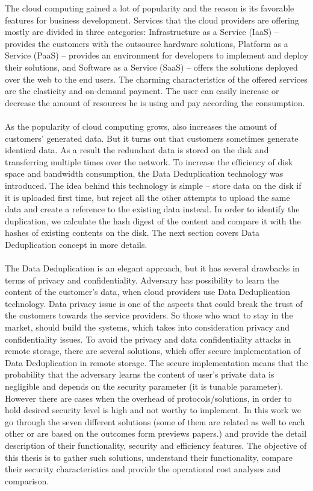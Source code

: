 \documentclass[12pt]{article}
\begin{document}
The cloud computing gained a lot of popularity and the reason is its  favorable features for  business development. Services that the cloud providers are offering  mostly are  divided in three categories: Infrastructure as a Service (IaaS) -- provides the customers with the outsource hardware solutions, Platform as a Service (PaaS) -- provides an environment for developers to implement and deploy their solutions, and Software as a Service (SaaS) -- offers the solutions deployed over the web to the end users. The  charming characteristics of the offered services  are the elasticity and on-demand payment. The user can easily increase or decrease the amount of resources he is using and pay according the consumption.\\\\
As the popularity of cloud computing grows, also increases the amount of customers' generated data. But it turns out that customers sometimes generate identical data.\cite{ratio} As a result the redundant data is stored on the disk and transferring multiple times over the network. To increase the efficiency of disk space and bandwidth consumption, the Data Deduplication
technology was introduced. The idea behind this technology is simple -- store data on the disk if it is uploaded first time, but reject  all the other attempts to upload the same data and create a reference to the existing data instead. In order to identify the duplication, we calculate the hash digest of the content  and compare it with the hashes of existing contents on the disk. The next section covers Data Deduplication concept in more details.\\\\
The Data Deduplication is an elegant approach, but it has several drawbacks in terms of privacy and confidentiality. Adversary has possibility to learn the content of the customer's data, when cloud providers use Data Deduplication technology. Data privacy issue  is one of the aspects that could break the trust of the customers towards the service providers. So those who want to stay in the market, should build the systems, which takes into consideration privacy and confidentiality issues. To avoid the privacy and data confidentiality attacks in remote storage, there are several solutions, which offer secure implementation of Data Deduplication in remote storage. The secure implementation means that the probability that the adversary learns the content of user's private data is negligible and depends on the security parameter (it is tunable parameter). However there are cases when the overhead of protocols/solutions, in order to hold desired security level is high and not worthy to  implement. In this work we go through the seven different solutions (some of them are related as well to each other or are based on the outcomes form previews papers.) and provide the detail description of their functionality, security and efficiency features. The objective of this thesis is to gather such solutions, understand their functionality, compare their security characteristics and  provide the operational cost analyses and comparison.\\\\
\end{document}
